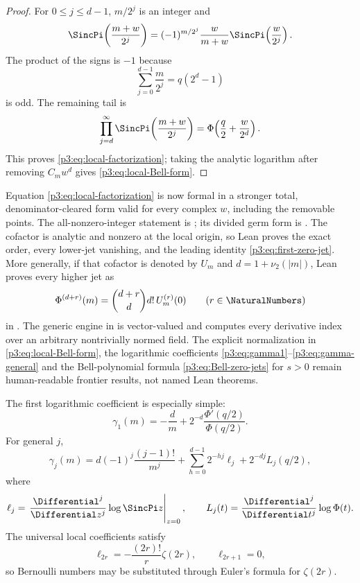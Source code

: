 \documentclass[11pt,oneside]{article}
\numberwithin{equation}{section}
\theoremstyle{definition}
\theoremstyle{remark}
\begin{document}
\begin{proof}
For $0\le j\le d-1$, $m/2^j$ is an integer and
\[
 \SincPi\!\left(\frac{m+w}{2^j}\right)
 =(-1)^{m/2^j}\frac{w}{m+w}
 \SincPi\!\left(\frac{w}{2^j}\right).
\]
The product of the signs is $-1$ because
\[
 \sum_{j=0}^{d-1}\frac m{2^j}=q(2^d-1)
\]
is odd.  The remaining tail is
\[
 \prod_{j=d}^{\infty}\SincPi\!\left(\frac{m+w}{2^j}\right)
 =\Phi\!\left(\frac q2+\frac{w}{2^d}\right).
\]
This proves \eqref{p3:eq:local-factorization}; taking the analytic logarithm after removing $C_mw^d$ gives \eqref{p3:eq:local-Bell-form}.
\end{proof}

\begin{statusbox}
Equation \eqref{p3:eq:local-factorization} is now formal in a stronger total,
denominator-cleared form valid for every complex \(w\), including the
removable points.  The all-nonzero-integer statement is
; its divided
germ form is
.
The cofactor is analytic and nonzero at the local origin, so Lean proves the exact order, every
lower-jet vanishing, and the leading identity
\eqref{p3:eq:first-zero-jet}.  More generally, if that cofactor is denoted by
\(U_m\) and \(d=1+\nu_2(|m|)\), Lean proves every higher jet as
\[
 \Phi^{(d+r)}(m)=\binom{d+r}{d}d!\,U_m^{(r)}(0)
 \qquad(r\in\NaturalNumbers)
\]
in .
The generic engine in  is vector-valued and computes
every derivative index over an arbitrary nontrivially normed field.  The
explicit normalization in \eqref{p3:eq:local-Bell-form}, the logarithmic coefficients
\eqref{p3:eq:gamma1}--\eqref{p3:eq:gamma-general} and the Bell-polynomial formula
\eqref{p3:eq:Bell-zero-jets} for \(s>0\) remain human-readable frontier
results, not named Lean theorems.
\end{statusbox}

The first logarithmic coefficient is especially simple:
\begin{equation}
 \gamma_1(m)=-\frac d m
 +2^{-d}\frac{\Phi'(q/2)}{\Phi(q/2)}.
 \label{p3:eq:gamma1}
\end{equation}
For general $j$,
\begin{equation}
 \gamma_j(m)
 =d(-1)^j\frac{(j-1)!}{m^j}
 +\sum_{h=0}^{d-1}2^{-hj}\ell_j
 +2^{-dj}L_j(q/2),
 \label{p3:eq:gamma-general}
\end{equation}
where
\[
 \ell_j=\left.\frac{\Differential^j}{\Differential z^j}\log\SincPi z\right|_{z=0},
 \qquad
 L_j(t)=\frac{\Differential^j}{\Differential t^j}\log\Phi(t).
\]
The universal local coefficients satisfy
\begin{equation}
 \ell_{2r}=-\frac{(2r)!}{r}\zeta(2r),
 \qquad \ell_{2r+1}=0,
 \label{p3:eq:sinc-log-jet}
\end{equation}
so Bernoulli numbers may be substituted through Euler's formula for $\zeta(2r)$.
\end{document}
